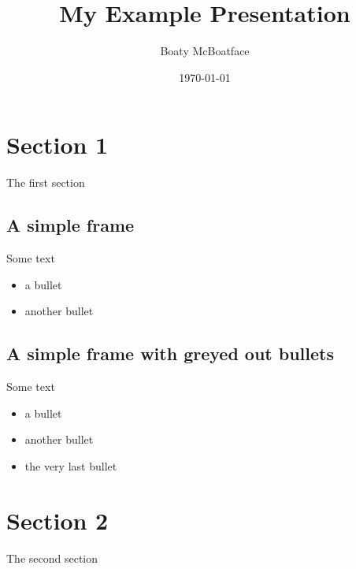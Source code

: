 \documentclass{beamer}
\title{My Example Presentation}
\author{Boaty McBoatface}
\institute{ResBaz 2022}
\date{\today}
\begin{document}
\begin{frame}
\titlepage %
\end{frame}


\frame{\tableofcontents}



\section{Section 1}
\begin{frame}
    \Huge{The first section}
\end{frame}

\subsection{A simple frame}
\begin{frame}
    Some text
    \begin{itemize}
        \item a bullet 
        \item another bullet
    \end{itemize}
\end{frame}


\subsection{A simple frame with greyed out bullets}
\begin{frame}
    Some text
    \begin{itemize}[<+>]
        \item a bullet 
        \item another bullet
        \item the very last bullet
    \end{itemize}
\end{frame}


\section{Section 2}
\begin{frame}
    \Huge{The second section}
\end{frame}
\end{document}
